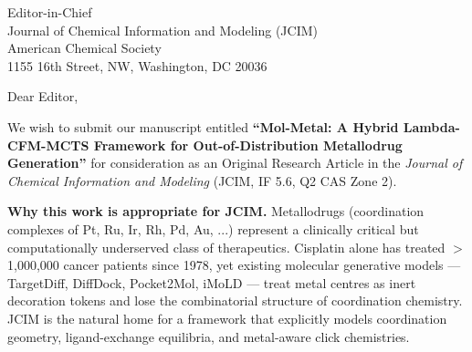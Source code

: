 \documentclass[11pt]{letter}
\begin{document}
\begin{letter}{Editor-in-Chief \\
  Journal of Chemical Information and Modeling (JCIM) \\
  American Chemical Society \\
  1155 16th Street, NW, Washington, DC 20036}

\opening{Dear Editor,}

We wish to submit our manuscript entitled \textbf{``Mol-Metal: A Hybrid
Lambda-CFM-MCTS Framework for Out-of-Distribution Metallodrug Generation''}
for consideration as an Original Research Article in the
\textit{Journal of Chemical Information and Modeling} (JCIM, IF 5.6,
Q2 CAS Zone 2).

\bigskip

\noindent\textbf{Why this work is appropriate for JCIM.}  Metallodrugs
(coordination complexes of Pt, Ru, Ir, Rh, Pd, Au, ...) represent a
clinically critical but computationally underserved class of therapeutics.
Cisplatin alone has treated $>$1{,}000{,}000 cancer patients since 1978,
yet existing molecular generative models --- TargetDiff, DiffDock,
Pocket2Mol, iMoLD --- treat metal centres as inert decoration tokens and
lose the combinatorial structure of coordination chemistry.  JCIM is the
natural home for a framework that explicitly models coordination
geometry, ligand-exchange equilibria, and metal-aware click chemistries.

\bigskip


\end{letter}
\end{document}

